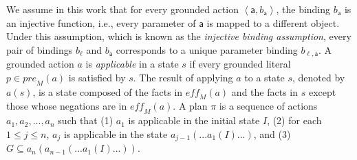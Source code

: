 \documentclass[letterpaper]{article} %
\newcommand{\pre}{\textit{pre}}
\newcommand{\eff}{\textit{eff}}
\theoremstyle{definition}
\theoremstyle{remark}
\newcommand{\tuple}[1]{\ensuremath{\left \langle #1 \right \rangle }}
\newcommand{\params}{\textit{params}}
\newcommand{\liftl}{\ensuremath{\ell}}
\newcommand{\lifta}{\mathsf{a}}
\newcommand{\bindings}{\textit{bindings}}
\begin{document}
We assume in this work that for every grounded action $\tuple{\lifta, b_\lifta}$, 
the binding $b_\lifta$ is an injective function, i.e., every parameter of $\lifta$ is mapped to a different object. 
Under this assumption, which is known as the \emph{injective binding assumption}, 
every pair of bindings $b_\liftl$ and $b_\lifta$ corresponds to a unique parameter binding $b_{\liftl,\lifta}$. %
A grounded action $a$ is \emph{applicable} in a state $s$ if every grounded literal $p\in \pre_M(a)$ is satisfied by $s$. 
The result of applying $a$ to a state $s$, denoted by $a(s)$, is a state composed of the facts in $\eff_M(a)$ and the facts in $s$ except those whose negations are in $\eff_M(a)$. 
A plan $\pi$ is a sequence of actions $a_1,a_2,...,a_n$ such that 
(1) $a_1$ is applicable in the initial state $I$, 
(2) for each $1 \leq j \leq n$, $a_j$ is applicable in the state $a_{j-1}(...a_1(I)...)$,
and (3) $G\subseteq a_n(a_{n-1}(...a_1(I)...))$. 
\end{document}
